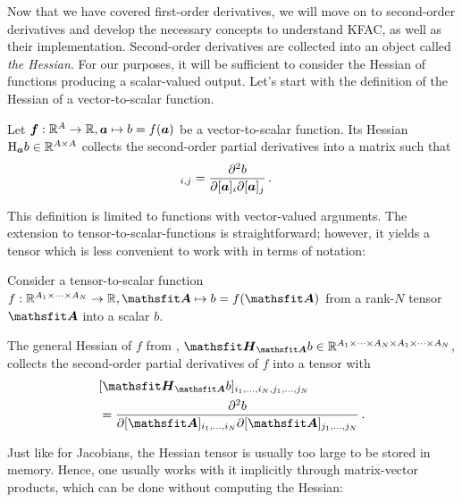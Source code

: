 Now that we have covered first-order derivatives, we will move on to second-order derivatives and develop the necessary concepts to understand KFAC, as well as their implementation.
Second-order derivatives are collected into an object called \emph{the Hessian}.
For our purposes, it will be sufficient to consider the Hessian of functions producing a scalar-valued output.
Let's start with the definition of the Hessian of a vector-to-scalar function.

\begin{definition}\label{def:vector_hessian}
  Let ${\bm{f}}: {\mathbb{R}}^A \to {\mathbb{R}}, {\bm{a}} \mapsto b = f({\bm{a}})$ be a vector-to-scalar function.
  Its Hessian $\mathrm{H}_{{\bm{a}}}b \in {\mathbb{R}}^{A \times A}$ collects the second-order partial derivatives into a matrix such that
  \begin{align*}
    [\hess_{\va}b]_{i,j}
    &=
      \frac{\partial^2 b}{\partial [\va]_i \partial [\va]_j}\,.
  \end{align*}
\end{definition}
This definition is limited to functions with vector-valued arguments. The extension to tensor-to-scalar-functions is straightforward; however, it yields a tensor which is less convenient to work with in terms of notation:

\begin{setup}\label{setup:hessians}
  Consider a tensor-to-scalar function $f: \sR^{A_1 \times \dots \times A_N} \to \sR, \tA \mapsto b = f(\tA)$ from a rank-$N$ tensor $\tA$ into a scalar $b$.
\end{setup}

\begin{definition}\label{def:general_hessian}
  The general Hessian of $f$ from , $\tH_{\tA}b \in \sR^{A_1 \times \dots \times A_N \times A_1 \times \dots \times A_N}$, collects the second-order partial derivatives of $f$ into a tensor with
  \begin{align*}
    &[\tH_{\tA}b]_{i_1, \dots, i_N, j_1, \dots, j_N}
      \\
    &=
      \frac{\partial^2 b}{\partial [\tA]_{i_1, \dots, i_N} \partial [\tA]_{j_1, \dots, j_N}}\,.
  \end{align*}
\end{definition}
Just like for Jacobians, the Hessian tensor is usually too large to be stored in memory.
Hence, one usually works with it implicitly through matrix-vector products, which can be done without computing the Hessian:

